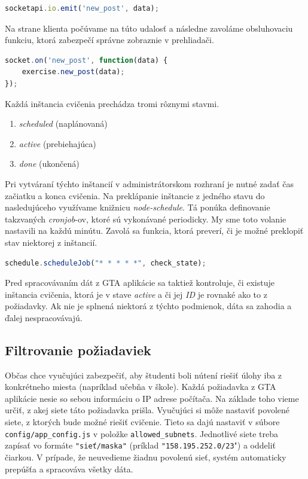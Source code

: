 \begin{lstlisting}[language=JavaScript]
socketapi.io.emit('new_post', data);
\end{lstlisting}

Na strane klienta počúvame na túto udalosť a následne zavoláme obsluhovaciu
funkciu, ktorá zabezpečí správne zobraznie v prehliadači.

\begin{lstlisting}[language=JavaScript]
socket.on('new_post', function(data) {
    exercise.new_post(data);
});
\end{lstlisting}

Každá inštancia cvičenia prechádza tromi rôznymi stavmi.
\begin{enumerate}
	\item \textit{scheduled} (naplánovaná)
	\item \textit{active} (prebiehajúca)
	\item \textit{done} (ukončená)
\end{enumerate}

Pri vytváraní týchto inštancií v administrátorskom rozhraní je nutné zadať
čas začiatku a konca cvičenia. Na preklápanie inštancie z jedného stavu do nasledujúceho
využívame knižnicu \textit{node-schedule}. Tá ponúka definovanie takzvaných
\textit{cronjob}-ov, ktoré sú vykonávané periodicky. My sme toto volanie nastavili
na každú minútu. Zavolá sa funkcia, ktorá preverí, či je možné preklopiť stav
niektorej z inštancií.

\begin{lstlisting}[language=JavaScript]
schedule.scheduleJob("* * * * *", check_state);
\end{lstlisting}

Pred spracovávaním dát z GTA aplikácie sa taktiež kontroluje, či existuje inštancia
cvičenia, ktorá je v stave \textit{active} a či jej \textit{ID} je rovnaké
ako to z požiadavky. Ak nie je splnená niektorá z týchto podmienok, dáta sa
zahodia a ďalej nespracovávajú.

\subsection{Filtrovanie požiadaviek}
\label{sec:gtadataprocessing:ipfilter}

Občas chce vyučujúci zabezpečiť, aby študenti boli nútení riešiť úlohy
iba z konkrétneho miesta (napríklad učebňa v škole). Každá požiadavka z GTA aplikácie
nesie so sebou informáciu o IP adrese počítača. Na základe toho vieme určiť,
z akej siete táto požiadavka prišla. Vyučujúci si môže nastaviť povolené siete,
z ktorých bude možné riešiť cvičenie. Tieto sa dajú nastaviť v súbore
\verb'config/app_config.js' v položke \verb'allowed_subnets'.
Jednotlivé siete treba zapísať vo formáte \verb'"sieť/maska"'
(príklad \verb'"158.195.252.0/23'") a oddeliť čiarkou.
V prípade, že neuvedieme žiadnu povolenú sieť, systém automaticky prepúšťa
a spracováva všetky dáta.

